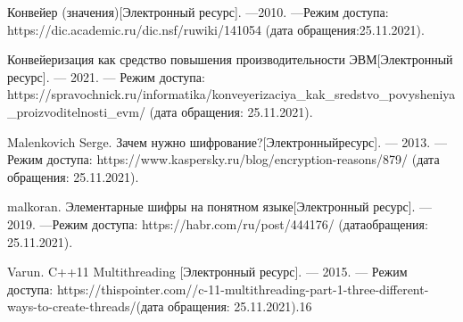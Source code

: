 \begin{thebibliography}{9}
    \label{cha:biblio}
    
     Конвейер (значения)[Электронный ресурс]. —2010. —Режим досту­па: https://dic.academic.ru/dic.nsf/ruwiki/141054 (дата обращения:25.11.2021).
    
     Конвейеризация как средство повышения производительно­сти ЭВМ[Электронный ресурс]. — 2021. — Режим доступа: https://spravochnick.ru/informatika/konveyerizaciya_kak_sredstvo_povysheniya_proizvoditelnosti_evm/ (дата обращения: 25.11.2021).
    
     Malenkovich Serge. Зачем нужно шифрование?[Электронныйресурс]. — 2013. — Режим доступа: https://www.kaspersky.ru/blog/encryption-reasons/879/ (дата обращения: 25.11.2021).
    
     malkoran. Элементарные шифры на понятном языке[Электронный ре­сурс]. —2019. —Режим доступа: https://habr.com/ru/post/444176/ (датаобращения: 25.11.2021).
    
     Varun. C++11 Multithreading [Электронный ре­сурс]. — 2015. — Режим доступа: https://thispointer.com//c-11-multithreading-part-1-three-different-ways-to-create-threads/(дата обращения: 25.11.2021).16

\end{thebibliography}
